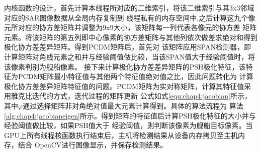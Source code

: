       内核函数的设计，首先计算本线程所对应的二维索引，将该二维索引与其3x3邻域对应的SAR图像数据从全局内存复制到
      线程私有的内存空间中,之后计算这九个像元所对应的协方差矩阵并调整为9x9大小，该矩阵每一列代表各像元的协方差
      矩阵元素。将该矩阵的第五列即中心像素的协方差矩阵与其他列依次做差求绝对和得到极化协方差差异矩阵。得到PCDM矩阵后，首先对
      该矩阵应用SPAN检测器，即计算矩阵对角线元素之和并与经验阈值做比较，当该SPAN值大于经验阈值时，将该像素判别为舰船像素。
      接下来计算极化协方差差异矩阵的PSH极化特征，该特征为PCDM矩阵最小特征值与其他两个特征值绝对值之比，因此问题转化为
      计算极化协方差差异矩阵特征值的问题。PCDM矩阵为实对称矩阵，计算其特征值采用雅克比迭代的方式，迭代过程的矩阵更新
      公式如式\ref{equ:chap4:jacobian}所示，其中$\varphi$通过选择矩阵非对角绝对值最大元素计算得到。具体的算法流程为
      算法\ref{alg:chap4:jacobianeigen}所示。得到矩阵的特征值后计算PSH极化特征的大小并与经验阈值做比较，如果PSH值大于
      经验阈值，则判断该像素为舰船目标像素。当GPU上所有线程核函数执行结束后，主机将检测结果从设备内存拷贝至主机内存，结合
      OpenCV进行图像显示，并保存检测结果。

